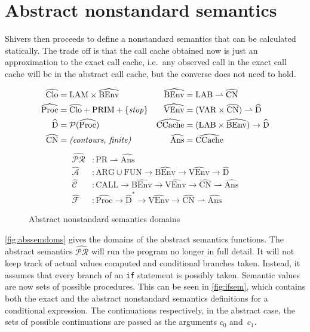 \documentclass[a4paper,parskip=half,BCOR=8mm,DIV=calc,12pt]{scrbook}
\newcommand{\aC}{\widehat{\mathcal C}}
\newcommand{\aF}{\widehat{\mathcal F}}
\newcommand{\aPR}{\widehat{\mathcal {PR}}}
\newcommand{\aA}{\widehat{\mathcal A}}
\begin{document}
\section{Abstract nonstandard semantics}

Shivers then proceeds to define a nonstandard semantics that can be calculated statically. The trade off is that the call cache obtained now is just an approximation to the exact call cache, i.e.\ any observed call in the exact call cache will be in the abstract call cache, but the converse does not need to hold.

\begin{figure}
\setlength{\FrameSep}{0pt}
\begin{framed}
\begin{align*}
\widehat{\text{Clo}} &= \text{LAM} \times \widehat{\text{BEnv}}
& \widehat{\text{BEnv}} &= \text{LAB} \rightharpoonup \widehat{\text{CN}} \\
\widehat{\text{Proc}} &= \widehat{\text{Clo}} + \text{PRIM} + \{\text{\textit{stop}}\} 
& \widehat{\text{VEnv}} &= (\text{VAR}\times \widehat{\text{CN}}) \rightharpoonup \widehat{\text{D}} \\
\widehat{\text{D}} &= \mathcal P(\widehat{\text{Proc}})
& \widehat{\text{CCache}} &= (\text{LAB} \times \widehat{\text{BEnv}}) \to \widehat{\text{D}} \\
\widehat{\text{CN}} &= \text{\textit{(contours, finite)}} 
& \widehat{\text{Ans}} &= \widehat{\text{CCache}}
\end{align*}
\begin{align*}
\aPR &\colon \text{PR} \rightharpoonup \widehat{\text{Ans}} \\
\aA &\colon \text{ARG}\cup\text{FUN} \to \widehat{\text{BEnv}} \to \widehat{\text{VEnv}} \to \widehat{\text{D}} \\
\aC &\colon \text{CALL}\to \widehat{\text{BEnv}} \to \widehat{\text{VEnv}} \to \widehat{\text{CN}} \rightharpoonup \widehat{\text{Ans}} \\
\aF &\colon \widehat{\text{Proc}}\to \widehat{\text{D}}^* \to \widehat{\text{VEnv}} \to \widehat{\text{CN}} \rightharpoonup \widehat{\text{Ans}}
\end{align*}
\end{framed}
\caption{Abstract nonstandard semantics domains}
\label{fig:abssemdoms}
\end{figure}

\vref{fig:abssemdoms} gives the domains of the abstract semantics functions. The abstract semantics $\aPR$ will run the program no longer in full detail. It will not keep track of actual values computed and conditional branches taken. Instead, it assumes that every branch of an \texttt{if} statement is possibly taken. Semantic values are now sets of possible procedures. This can be seen in \vref{fig:ifsem}, which contains both the exact and the abstract nonstandard semantics definitions for a conditional expression. The continuations respectively, in the abstract case, the sets of possible continuations are passed as the arguments $c_0$ and~$c_1$.
\end{document}

